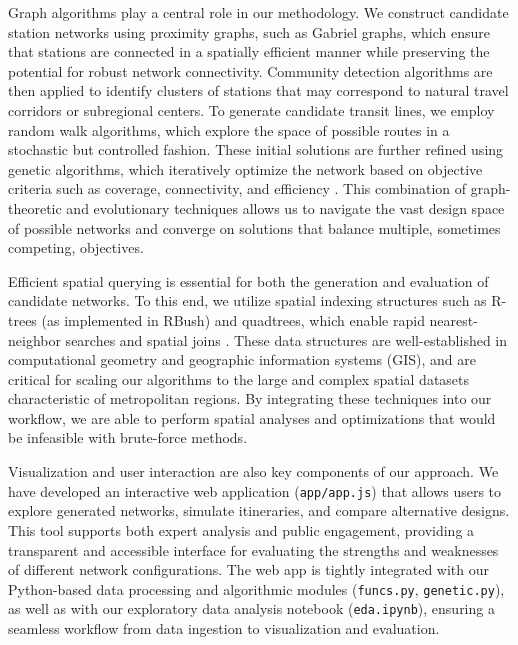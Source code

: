 \documentclass[manuscript,screen,review]{acmart}
\begin{document}
Graph algorithms play a central role in our methodology. We construct candidate station networks using proximity graphs, such as Gabriel graphs, which ensure that stations are connected in a spatially efficient manner while preserving the potential for robust network connectivity. Community detection algorithms are then applied to identify clusters of stations that may correspond to natural travel corridors or subregional centers. To generate candidate transit lines, we employ random walk algorithms, which explore the space of possible routes in a stochastic but controlled fashion. These initial solutions are further refined using genetic algorithms, which iteratively optimize the network based on objective criteria such as coverage, connectivity, and efficiency \cite{bib:chien2001genetic, bib:dib2017ga}. This combination of graph-theoretic and evolutionary techniques allows us to navigate the vast design space of possible networks and converge on solutions that balance multiple, sometimes competing, objectives.

Efficient spatial querying is essential for both the generation and evaluation of candidate networks. To this end, we utilize spatial indexing structures such as R-trees (as implemented in RBush) and quadtrees, which enable rapid nearest-neighbor searches and spatial joins \cite{bib:samet1984quadtrees, bib:libera1986btrees}. These data structures are well-established in computational geometry and geographic information systems (GIS), and are critical for scaling our algorithms to the large and complex spatial datasets characteristic of metropolitan regions. By integrating these techniques into our workflow, we are able to perform spatial analyses and optimizations that would be infeasible with brute-force methods.

Visualization and user interaction are also key components of our approach. We have developed an interactive web application (\texttt{app/app.js}) that allows users to explore generated networks, simulate itineraries, and compare alternative designs. This tool supports both expert analysis and public engagement, providing a transparent and accessible interface for evaluating the strengths and weaknesses of different network configurations. The web app is tightly integrated with our Python-based data processing and algorithmic modules (\texttt{funcs.py}, \texttt{genetic.py}), as well as with our exploratory data analysis notebook (\texttt{eda.ipynb}), ensuring a seamless workflow from data ingestion to visualization and evaluation.
\end{document}
